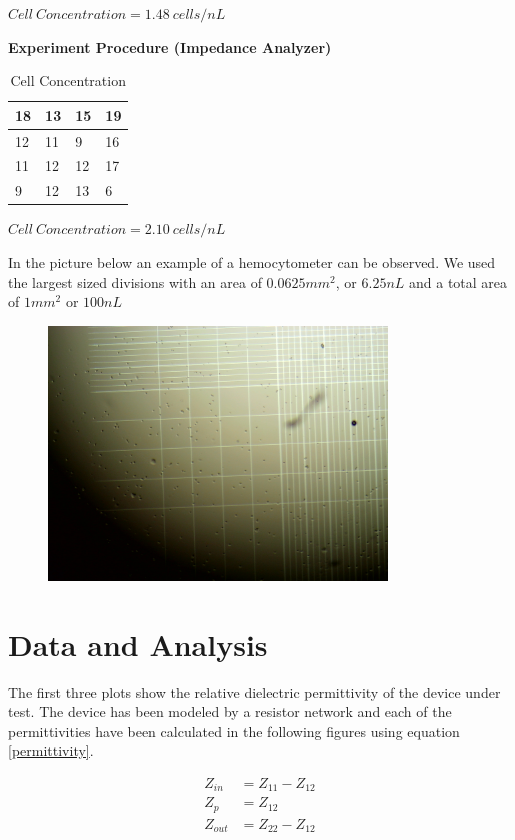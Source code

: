 \documentclass[journal]{IEEEtran}
\begin{document}
$Cell \: Concentration = 1.48 \: cells/nL$

\textbf{Experiment Procedure (Impedance Analyzer)} \\
\begin{table}[ht]
\centering
\caption{Cell Concentration}
\label{table-2}
\begin{tabular}{|l|l|l|l|}
\hline
18 & 13 & 15 & 19 \\ \hline
12 & 11 & 9  & 16 \\ \hline
11 & 12 & 12 & 17 \\ \hline
9  & 12 & 13 & 6  \\ \hline
\end{tabular}
\end{table}

$Cell \: Concentration = 2.10 \: cells/nL$

In the picture below an example of a hemocytometer can be observed. We used the largest sized divisions with an area of $0.0625 mm^2$, or $6.25nL$ and a total area of $1mm^2$ or $100nL$

\begin{figure}[h]
\label{hemocytometer}
\includegraphics[width=9cm]{hemocytometer.jpg}
\end{figure}

\vfill

\section{Data and Analysis}
The first three plots show the relative dielectric permittivity of the device under test. The device has been modeled by a resistor network and each of the permittivities have been calculated in the following figures using equation \ref{permittivity}.

\begin{align*}
Z_{in} &= Z_{11} - Z_{12} \\
Z_{p} &= Z_{12} \\
Z_{out} &= Z_{22} - Z_{12} \\
\end{align*} 
\end{document}
